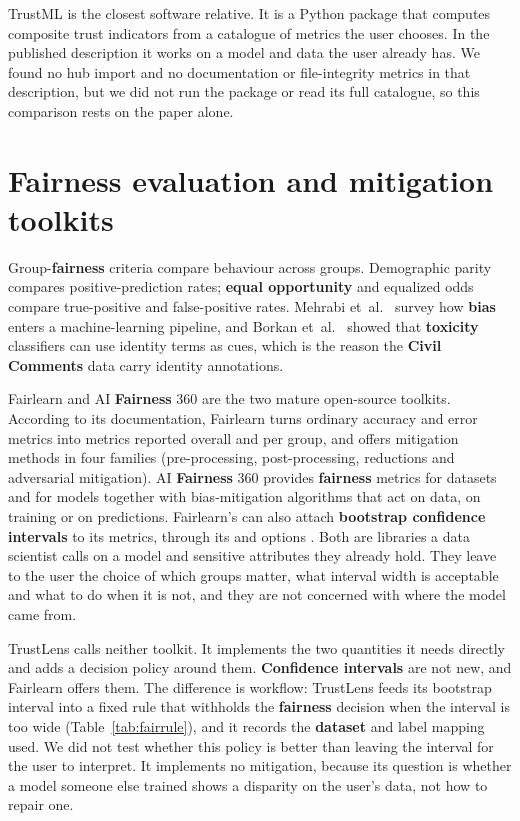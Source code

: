 TrustML \cite{manzano2024} is the closest software relative. It is a Python package that computes composite trust indicators from a catalogue of metrics the user chooses. In the published description it works on a model and data the user already has. We found no hub import and no documentation or file-integrity metrics in that description, but we did not run the package or read its full catalogue, so this comparison rests on the paper alone.

\section{Fairness evaluation and mitigation toolkits}
Group-\textbf{fairness} criteria compare behaviour across groups. Demographic parity compares positive-prediction rates; \textbf{equal opportunity} and equalized odds \cite{hardt2016} compare true-positive and false-positive rates. Mehrabi et~al.\ \cite{mehrabi2021} survey how \textbf{bias} enters a machine-learning pipeline, and Borkan et~al.\ \cite{borkan2019} showed that \textbf{toxicity} classifiers can use identity terms as cues, which is the reason the \textbf{Civil Comments} data carry identity annotations.

Fairlearn \cite{weerts2023fairlearn} and AI \textbf{Fairness} 360 \cite{bellamy2019aif360} are the two mature open-source toolkits. According to its documentation, Fairlearn turns ordinary accuracy and error metrics into metrics reported overall and per group, and offers mitigation methods in four families (pre-processing, post-processing, reductions and adversarial mitigation). AI \textbf{Fairness} 360 provides \textbf{fairness} metrics for datasets and for models together with bias-mitigation algorithms that act on data, on training or on predictions. Fairlearn's  can also attach \textbf{bootstrap confidence intervals} to its metrics, through its  and  options \cite{fairlearnci}. Both are libraries a data scientist calls on a model and sensitive attributes they already hold. They leave to the user the choice of which groups matter, what interval width is acceptable and what to do when it is not, and they are not concerned with where the model came from.

TrustLens calls neither toolkit. It implements the two quantities it needs directly and adds a decision policy around them. \textbf{Confidence intervals} are not new, and Fairlearn offers them. The difference is workflow: TrustLens feeds its bootstrap interval into a fixed rule that withholds the \textbf{fairness} decision when the interval is too wide (Table~\ref{tab:fairrule}), and it records the \textbf{dataset} and label mapping used. We did not test whether this policy is better than leaving the interval for the user to interpret. It implements no mitigation, because its question is whether a model someone else trained shows a disparity on the user's data, not how to repair one.

